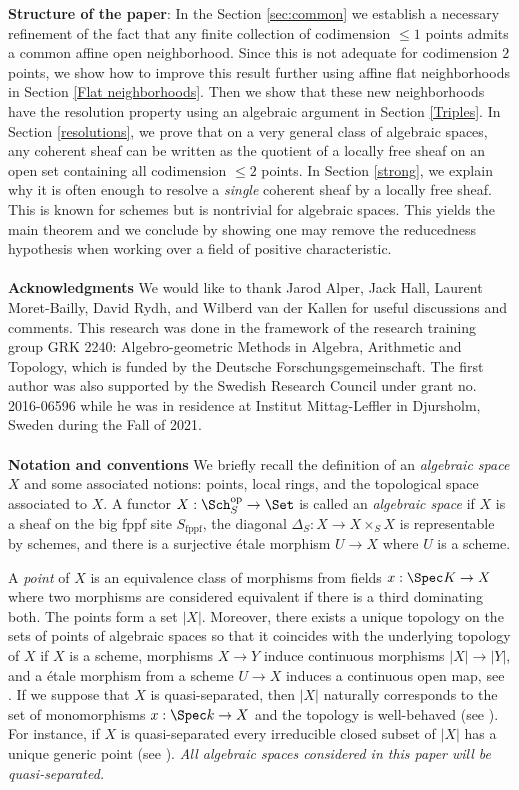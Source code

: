 \documentclass[12pt]{amsart}
\begin{document}
\noindent \textbf{Structure of the paper}: In the Section \ref{sec:common} we establish a necessary refinement of the fact that any finite collection of codimension $\leq 1$ points admits a common affine open neighborhood. Since this is not adequate for codimension $2$ points, we show how to improve this result further using affine flat neighborhoods in Section \ref{Flat neighborhoods}. Then we show that these new neighborhoods have the resolution property using an algebraic argument in Section \ref{Triples}. In Section \ref{resolutions}, we prove that on a very general class of algebraic spaces, any coherent sheaf can be written as the quotient of a locally free sheaf on an open set containing all codimension $\leq 2$ points. In Section \ref{strong}, we explain why it is often enough to resolve a \emph{single} coherent sheaf by a locally free sheaf. This is known for schemes but is nontrivial for algebraic spaces. This yields the main theorem and we conclude by showing one may remove the reducedness hypothesis when working over a field of positive characteristic. 
\\\\
\noindent \textbf{Acknowledgments} We would like to thank Jarod Alper, Jack Hall, Laurent Moret-Bailly, David Rydh, and Wilberd van der Kallen for useful discussions and comments. This research was done in the framework of the research training group GRK 2240: Algebro-geometric Methods in Algebra, Arithmetic and Topology, which is funded by the Deutsche Forschungsgemeinschaft. The first author was also supported by the Swedish Research Council under grant no. 2016-06596 while he was in residence at Institut Mittag-Leffler in Djursholm, Sweden during the Fall of 2021.
\\\\
\noindent \textbf{Notation and conventions} We briefly recall the definition of an \emph{algebraic space} $X$ and some associated notions: points, local rings, and the topological space associated to $X$.  A functor $X: \Sch_{S}^{\text{op}} \to \Set$ is called an \emph{algebraic space} if $X$ is a sheaf on the big fppf site $S_{\text{fppf}}$, the diagonal $\Delta_S: X \to X \times_S X$ is representable by schemes, and there is a surjective \'etale morphism $U \to X$ where $U$ is a scheme.

A \emph{point} of $X$ is an equivalence class of morphisms from fields $x: \Spec K \to X$ where two morphisms are considered equivalent if there is a third dominating both. The points form a set $|X|$. Moreover, there exists a unique topology on the sets of points of algebraic spaces so that it coincides with the underlying topology of $X$ if $X$ is a scheme, morphisms $X \to Y$ induce continuous morphisms $|X| \to |Y|$, and a \'etale morphism from a scheme $U \to X$ induces a continuous open map, see \cite[Tag 03BT]{stacks}. If we suppose that $X$ is quasi-separated, then $|X|$ naturally corresponds to the set of monomorphisms $x: \Spec k \to X$ and the topology is well-behaved (see \cite[Tags 03IG, 06NI]{stacks}). For instance, if $X$ is quasi-separated every irreducible closed subset of $|X|$ has a unique generic point (see \cite[Tag 06NJ]{stacks}). \emph{All algebraic spaces considered in this paper will be quasi-separated.}
\end{document}
